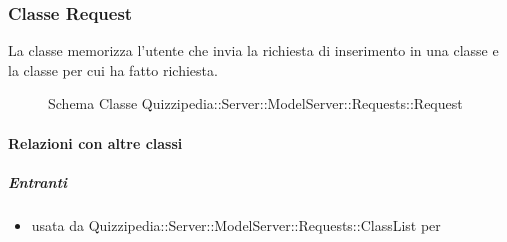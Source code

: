 \subsubsection{Classe Request}
La classe memorizza l'utente che invia la richiesta di inserimento in una classe e la classe per cui ha fatto richiesta.
\begin{figure}[H]
\centering
\noindent{}
\caption[Schema Classe Request]{Schema Classe Quizzipedia::Server::ModelServer::Requests::Request}
\end{figure}
\paragraph{Relazioni con altre classi}
\subparagraph{Entranti}
\begin{itemize}
\item usata da Quizzipedia::Server::ModelServer::Requests::ClassList per 
\end{itemize}
